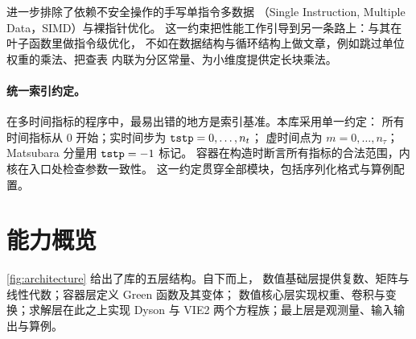  进一步排除了依赖不安全操作的手写单指令多数据
（Single Instruction, Multiple Data，SIMD）与裸指针优化。
这一约束把性能工作引导到另一条路上：与其在叶子函数里做指令级优化，
不如在数据结构与循环结构上做文章，例如跳过单位权重的乘法、把查表
内联为分区常量、为小维度提供定长块乘法。

\paragraph{统一索引约定。}
在多时间指标的程序中，最易出错的地方是索引基准。本库采用单一约定：
所有时间指标从 $0$ 开始；实时间步为 $\texttt{tstp} = 0,\dots,n_t$；
虚时间点为 $m = 0,\dots,n_\tau$；Matsubara 分量用 $\texttt{tstp} = -1$ 标记。
容器在构造时断言所有指标的合法范围，内核在入口处检查参数一致性。
这一约定贯穿全部模块，包括序列化格式与算例配置。

\section{能力概览}
\label{sec:capabilities}

\cref{fig:architecture} 给出了库的五层结构。自下而上，
数值基础层提供复数、矩阵与线性代数；容器层定义 Green 函数及其变体；
数值核心层实现权重、卷积与变换；求解层在此之上实现 Dyson 与 VIE2
两个方程族；最上层是观测量、输入输出与算例。

